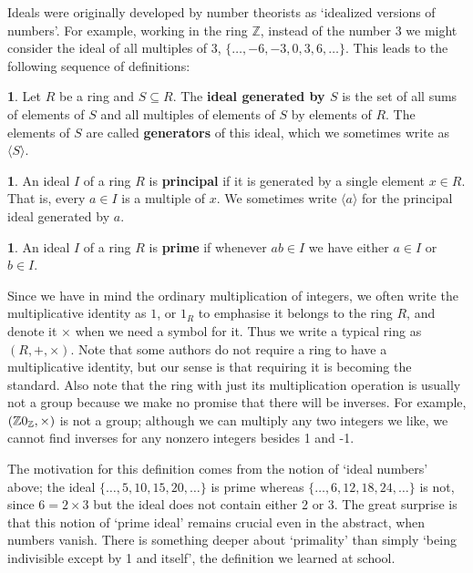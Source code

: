 \documentclass[oneside,english]{amsbook}
\numberwithin{section}{chapter}
\theoremstyle{plain}
\theoremstyle{definition}
\newtheorem{defn}[thm]{\protect\definitionname}
\providecommand{\definitionname}{Definition}
\begin{document}
Ideals were originally developed by number theorists as `idealized versions of numbers'. For example, working in the ring $\mathbb{Z}$, instead of the number 3 we might consider the ideal of all multiples of 3, $\{\ldots, -6, -3, 0, 3, 6, \ldots\}$. This leads to the following sequence of definitions:

\begin{defn}
	Let $R$ be a ring and $S\subseteq R$. The \textbf{ideal generated by $S$} is the set of all sums of elements of $S$ and all multiples of elements of $S$ by elements of $R$. The elements of $S$ are called \textbf{generators} of this ideal, which we sometimes write as $\langle S\rangle$.
\end{defn}

\begin{defn}
	An ideal $I$ of a ring $R$ is \textbf{principal} if it is generated by a single element $x\in R$. That is, every $a\in I$ is a multiple of $x$. We sometimes write $\langle a\rangle$ for the principal ideal generated by $a$.
\end{defn}

\begin{defn}
	An ideal $I$ of a ring $R$ is \textbf{prime} if whenever $ab\in I$ we have either $a\in I$ or $b\in I$.
\end{defn}

Since we have in mind the ordinary multiplication of integers, we often write the multiplicative identity as $1$, or $1_R$ to emphasise it belongs to the ring $R$, and denote it $\times$ when we need a symbol for it. Thus we write a typical ring as $(R, +, \times)$. Note that some authors do not require a ring to have a multiplicative identity, but our sense is that requiring it is becoming the standard. Also note that the ring with just its multiplication operation is usually not a group because we make no promise that there will be inverses. For example, $(\mathbb{Z}\\0_{\mathbb{Z}}, \times)$ is not a group; although we can multiply any two integers we like, we cannot find inverses for any nonzero integers besides 1 and -1.

The motivation for this definition comes from the notion of `ideal numbers' above; the ideal $\{\ldots, 5, 10, 15, 20, \ldots\}$ is prime whereas $\{\ldots, 6, 12, 18, 24, \ldots\}$ is not, since $6 = 2\times 3$ but the ideal does not contain either 2 or 3. The great surprise is that this notion of `prime ideal' remains crucial even in the abstract, when numbers vanish. There is something deeper about `primality' than simply `being indivisible except by 1 and itself', the definition we learned at school.
\end{document}
